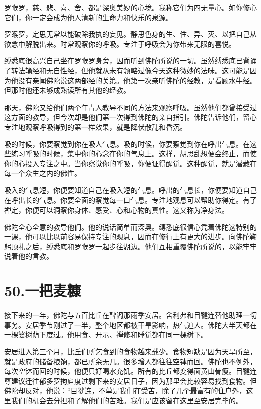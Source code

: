 \documentclass[12pt,twoside,openany]{book}
\begin{document}
罗睺罗，慈、悲、喜、舍、都是深奥美妙的心境。我称它们为四无量心。如你修心它们，你一定会成为他人清新的生命力和快乐的泉源。

罗睺罗，定思无常以能破除我执的妄见。静思色身的生、住、异、灭、以把自己从欲念中解脱出来。时常观察你的呼吸。专注于呼吸会为你带来无限的喜悦。

缚悉底很高兴自己坐在罗睺罗身旁，因而听到佛陀所说的一切。虽然缚悉底已背诵了转法输经和无自性经，但他就从未有领略过像今天这种微妙的法味。这可能是因为他没有亲闻佛陀说这两部经的关第。他第一次亲听佛陀的经教，是看顾水牛经。但那时他还未够成熟读所有其他的经教。

那天，佛陀又给他们两个年青人教导不同的方法来观察呼吸。虽然他们都曾接受过这方面的教导，但今次却是他们第一次得到佛陀的亲自指引。佛陀告诉他们，留心专注地观察呼吸得到的第一样效果，就是降伏散乱和昏沉。

吸的时候，你要察觉到你在吸人气息。吸的时候，你要察觉到你在呼出气息。在这些练习呼吸的时候，集中你的心念在你的气息上。这样，胡思乱想便会终止，而使你的心投入专注之中。当你察觉你的呼吸，你便证得醒觉。这种醒觉，就是潜藏在每一个众生之内的佛性。

吸入的气息短，你便要知道自己在吸入短的气息。呼出的气息长，你便要知道自己在呼出长的气息。你要全面的察觉每一口气息。专注地观息可以帮助你得定。有了禅定，你便可以洞察你身体、感受、心和心物的真性。这又称为净身法。

佛陀全心全意的教导他们。他的说话简单而深奥。缚悉底很信心凭着佛陀这特别的一课，他可以比以前容易保持专注的观息，因而在修行上有更大的进步。向佛陀鞠躬顶礼之后，缚悉底和罗睺罗一起步往湖边。他们互相重覆佛陀所说的，以能牢牢说着他的言教。


\chapter{50.一把麦糠}\label{ch50}

接下来的一年，佛陀与五百比丘在鞞阇那雨季安居。舍利弗和目犍连替他助理一切事务。安居季节刚过了一半，整个地区都被干旱影响，热气迫人。佛陀大半天都在一棵婆树荫下度过。他用食、开示、禅修和睡觉都在同一棵树下。

安居进入第三个月，比丘们所乞食到的食物越来载少。食物短缺是因为天旱所至，就是政府的储备粮饷，都已所余无几。很多增人都往往空钵而回。佛陀也不例外，每次空钵而回的时候，他便只好喝水充饥。所有的比丘都变得面黄山骨瘦。目犍连尊建议迁往郁多罗拘庐度过剩下来的安居日子，因为那里会比较容易找到食物。但佛陀却反对，他说：“目犍连，不单是我们在受苦，除了几个最富有的住户外，这里我们的机会去分担和了解他们的苦难。我们是应该留在这里至安居完毕的。
\end{document}
